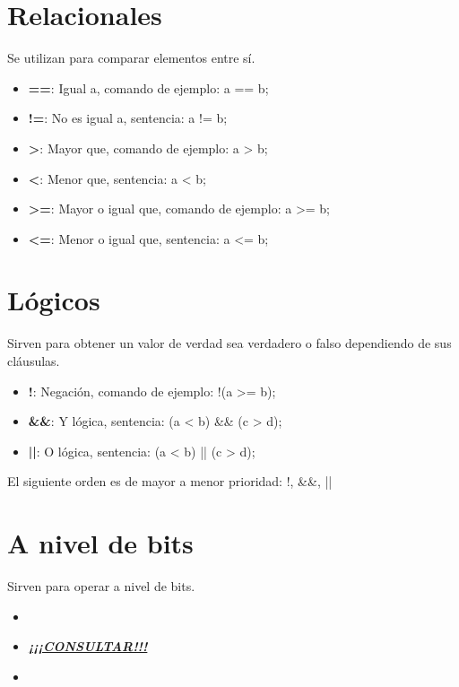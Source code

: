 \section [Relacionales]{Relacionales}
{Se utilizan para comparar elementos entre sí.}
\vspace{1em}
\begin{itemize}
	\item \textbf{==}: {Igual a, comando de ejemplo: {a == b;}}
	\item \textbf{!=}: {No es igual a, sentencia: {a != b;}}
	\item \textbf{>}: {Mayor que, comando de ejemplo: {a > b;}}
	\item \textbf{<}: {Menor que, sentencia: {a < b;}}
	\item \textbf{>=}: Mayor o igual que, comando de ejemplo: {a >= b;}
	\item \textbf{<=}: Menor o igual que, sentencia: {a <= b;}
\end{itemize}

\section [Lógicos]{Lógicos}
{Sirven para obtener un valor de verdad sea verdadero o falso dependiendo de sus cláusulas.}
\vspace{1em}
\begin{itemize}
	\item \textbf{!}: {Negación, comando de ejemplo: {!(a >= b);}}
	\item \textbf{\&\&}: {Y lógica, sentencia: {(a < b) \&\& (c > d);}}
	\item \textbf{||}: {O lógica, sentencia: {(a < b) || (c > d);}}
\end{itemize}
El siguiente orden es de mayor a menor prioridad: {!, \&\&, ||}

\section [A nivel de bits]{A nivel de bits}
{Sirven para operar a nivel de bits.}

\vspace{1em}
\begin{itemize}
	\item 
	\item {\Huge \textbf{\textit{\underline{¡¡¡CONSULTAR!!!}}}}
	\item 
\end{itemize}

